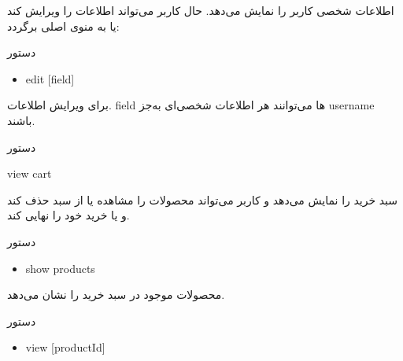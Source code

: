 \documentclass[]{article}
\begin{document}
اطلاعات شخصی کاربر را نمایش می‌دهد. حال کاربر می‌تواند اطلاعات را ویرایش کند یا به منوی اصلی برگردد:

\begin{mybox}[colback=brilliantlavender]{دستور}

\begin{latin}

\begin{itemize}[label = {$\Rightarrow$}]

\item
edit [field] 

\end{itemize}

\end{latin}

\end{mybox}

برای ویرایش اطلاعات. field ها می‌توانند هر اطلاعات شخصی‌ای به‌جز username باشند.

\hrulefill

\begin{mybox}[colback=yellow]{دستور}

\begin{latin}

view cart

\end{latin}

\end{mybox}

سبد خرید را نمایش می‌دهد و کاربر می‌تواند محصولات را مشاهده یا از سبد حذف کند و یا خرید خود را نهایی کند.


\begin{mybox}[colback=brilliantlavender]{دستور}

\begin{latin}

\begin{itemize}[label = {$\Rightarrow$}]

\item
show products

\end{itemize}

\end{latin}

\end{mybox}

محصولات موجود در سبد خرید را نشان می‌دهد.


\begin{mybox}[colback=brilliantlavender]{دستور}

\begin{latin}

\begin{itemize}[label = {$\Rightarrow$}]

\item
view [productId]

\end{itemize}

\end{latin}

\end{mybox}
\end{document}
